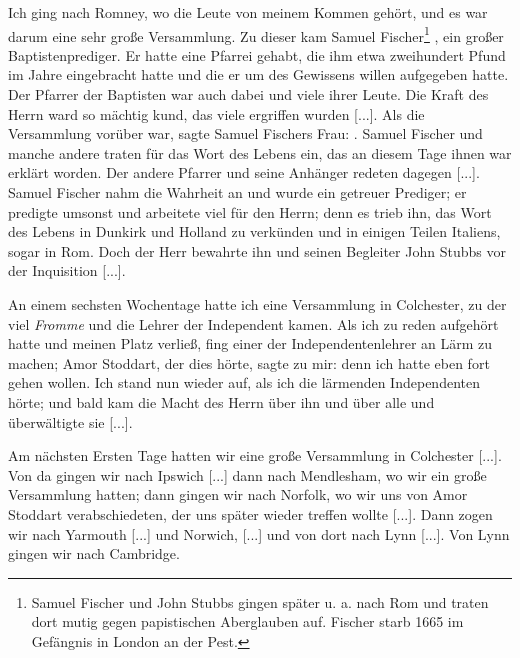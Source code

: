 Ich ging nach Romney, wo die Leute von meinem Kommen
gehört, und es war darum eine sehr große Versammlung. Zu
dieser kam Samuel Fischer\footnote{Samuel Fischer und John 
Stubbs gingen später u. a. nach Rom und
traten dort mutig gegen papistischen Aberglauben auf. 
Fischer starb 1665 im Gefängnis in London an der Pest.}
, ein 
großer Baptistenprediger. Er
hatte eine Pfarrei gehabt, die ihm etwa zweihundert Pfund im
Jahre eingebracht hatte und die er um des Gewissens willen 
aufgegeben hatte. Der Pfarrer der Baptisten war auch dabei und
viele ihrer Leute. Die Kraft des Herrn ward so mächtig kund,
das viele ergriffen wurden [...]. Als die Versammlung vorüber
war, sagte Samuel Fischers Frau: .
Samuel Fischer und manche andere traten für das Wort des
Lebens ein, das an diesem Tage ihnen war erklärt worden. Der
andere Pfarrer und seine Anhänger redeten dagegen [...].
Samuel Fischer nahm die Wahrheit an und wurde ein getreuer
Prediger; er predigte umsonst und arbeitete viel für den Herrn;
denn es trieb ihn, das Wort des Lebens in Dunkirk 
und Holland zu verkünden und in einigen 
Teilen Italiens, sogar in Rom.
Doch der Herr bewahrte ihn und seinen Begleiter John Stubbs
vor der Inquisition [...].


An einem sechsten Wochentage hatte ich eine Versammlung
in Colchester, zu der viel \textit{Fromme} 
und die Lehrer der Independent kamen. Als ich zu reden 
aufgehört hatte und meinen Platz verließ, fing einer 
der Independentenlehrer an Lärm zu
machen; Amor Stoddart, der dies 
hörte, sagte zu mir:  
denn ich hatte eben fort gehen wollen.
Ich stand nun wieder auf, als ich die lärmenden Independenten
hörte; und bald kam die Macht des Herrn über ihn und über
alle und überwältigte sie [...].


Am nächsten Ersten Tage hatten wir eine große Versammlung
in Colchester [...]. Von da gingen wir 
nach Ipswich [...] dann
nach Mendlesham, wo wir ein große Versammlung 
hatten; dann gingen wir nach Norfolk, wo wir 
uns von Amor Stoddart verabschiedeten, 
der uns später wieder treffen wollte [...]. Dann
zogen wir nach Yarmouth [...] und 
Norwich, [...] und von
dort nach Lynn [...]. Von Lynn gingen wir nach 
Cambridge.


